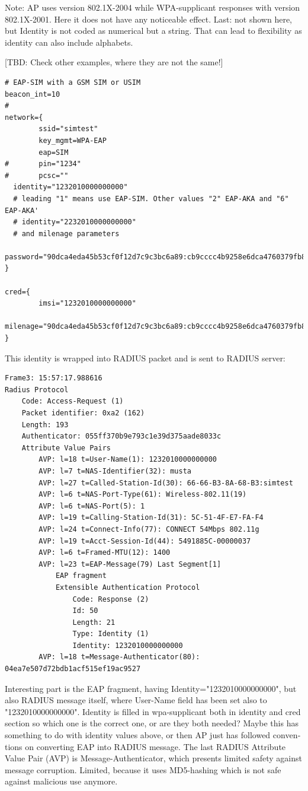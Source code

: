 \documentclass[12pt,a4paper,english]{tutthesis}
\begin{document}
\begin{otherlanguage}{english}
Note: AP uses version 802.1X-2004 while WPA-supplicant responses with
version 802.1X-2001. Here it does not have any noticeable effect.
Last: not shown here, but Identity is not coded as numerical but a string.
That can lead to flexibility as identity can also include alphabets.

[TBD: Check other examples, where  they are not the same!]


\begin{verbatim}
# EAP-SIM with a GSM SIM or USIM
beacon_int=10
#
network={
        ssid="simtest"
        key_mgmt=WPA-EAP
        eap=SIM
#       pin="1234"
#       pcsc=""
  identity="1232010000000000"
  # leading "1" means use EAP-SIM. Other values "2" EAP-AKA and "6" EAP-AKA'
  # identity="2232010000000000"
  # and milenage parameters
  password="90dca4eda45b53cf0f12d7c9c3bc6a89:cb9cccc4b9258e6dca4760379fb82581"
}

cred={
        imsi="1232010000000000"
        milenage="90dca4eda45b53cf0f12d7c9c3bc6a89:cb9cccc4b9258e6dca4760379fb82581"
}
\end{verbatim}

This identity is wrapped into RADIUS packet and is sent to RADIUS
server:
\begin{verbatim}
Frame3: 15:57:17.988616
Radius Protocol
    Code: Access-Request (1)
    Packet identifier: 0xa2 (162)
    Length: 193
    Authenticator: 055ff370b9e793c1e39d375aade8033c
    Attribute Value Pairs
        AVP: l=18 t=User-Name(1): 1232010000000000
        AVP: l=7 t=NAS-Identifier(32): musta
        AVP: l=27 t=Called-Station-Id(30): 66-66-B3-8A-68-B3:simtest
        AVP: l=6 t=NAS-Port-Type(61): Wireless-802.11(19)
        AVP: l=6 t=NAS-Port(5): 1
        AVP: l=19 t=Calling-Station-Id(31): 5C-51-4F-E7-FA-F4
        AVP: l=24 t=Connect-Info(77): CONNECT 54Mbps 802.11g
        AVP: l=19 t=Acct-Session-Id(44): 5491885C-00000037
        AVP: l=6 t=Framed-MTU(12): 1400
        AVP: l=23 t=EAP-Message(79) Last Segment[1]
            EAP fragment
            Extensible Authentication Protocol
                Code: Response (2)
                Id: 50
                Length: 21
                Type: Identity (1)
                Identity: 1232010000000000
        AVP: l=18 t=Message-Authenticator(80): 04ea7e507d72bdb1acf515ef19ac9527
\end{verbatim}
Interesting part is the EAP fragment, having
Identity="1232010000000000", but
also RADIUS message itself, where User-Name field has been set also 
to "1232010000000000". 
Identity is filled in wpa-supplicant both in identity and cred
section so which one is the correct one, or are they both needed?
Maybe this has something to do with identity
values above, or then AP just has followed conventions on converting
EAP into RADIUS message. The last RADIUS Attribute Value Pair (AVP) is 
Message-Authenticator, which presents limited safety against message 
corruption. Limited, because it uses MD5-hashing which is not safe
against malicious use anymore.







\end{otherlanguage}
\end{document}
